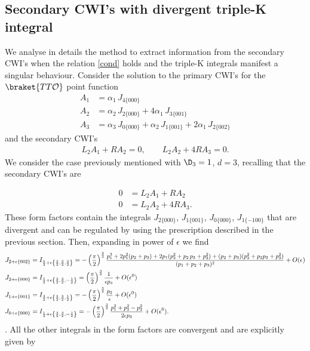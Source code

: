 \documentclass[a4paper,11pt,openright,twoside]{book}
\newcommand{\mO}{\mathcal{O}}
\let\a=\alpha   \let\b=\beta   \let\g=\gamma   \let\d=\delta
\let\e=\epsilon \let\z=\zeta   \let\h=\eta     \let\q=\theta
\newcommand{\sdfrac}[2]{\mbox{\small$\displaystyle\frac{#1}{#2}$}}
\numberwithin{equation}{section}
\begin{document}
{{{\subsection{Secondary CWI's with divergent triple-K integral} 
We analyse in details the method to extract information from the secondary CWI's when the relation \eqref{cond} holds and the triple-K integrals manifest a singular behaviour. 
Consider the solution to the primary CWI's for the $\braket{TT\mO}$ point function 
\begin{align}
	A_1&=\a_1\,J_{4\{000\}}\\
	A_2&=\a_2\,J_{2\{000\}}+4\a_{1}\,J_{3\{001\}}\\
	A_3&=\a_3\,J_{0\{000\}}+\a_{2}\,J_{1\{001\}}+2\a_{1}\,J_{2\{002\}}\label{TTOsol}
\end{align}
and the secondary CWI's
\begin{align}
	L_2A_1+RA_2=0,\qquad L_2A_2+4RA_3=0.
\end{align}
We consider the case previously mentioned with $\D_3=1$, $d=3$, recalling that the secondary CWI's are}
\begin{align}
0&=L_2A_1+RA_2\\
0&=L_2A_2+4RA_3.
\end{align}
{
These form factors contain the integrals $J_{2\{000\}}$, $J_{1\{001\}}$, $J_{0\{000\}}$, $J_{1\{-100\}}$ that are divergent and can be regulated by using the prescription described in the previous section. Then, expanding in power of $\epsilon$ we find
\begin{align}
	J_{2+\e\{002\}}&=I_{\frac{5}{2}+\e\left\{\frac{3}{2},\frac{3}{2},\frac{3}{2}\right\}}=-\left(\sdfrac{\pi}{2}\right)^\frac{3}{2}\sdfrac{p_1^3+2p_1^2(p_2+p_3)+2p_1(p_2^2+p_2\,p_3+p_3^2)+(p_2+p_3)(p_2^2+p_2p_3+p_3^2)}{(p_1+p_2+p_3)^2}+O(\e)\notag\\
	J_{2+\e\{000\}}&=I_{\frac{5}{2}+\e\left\{\frac{3}{2},\frac{3}{2},-\frac{1}{2}\right\}}=\left(\sdfrac{\pi}{2}\right)^\frac{3}{2}\sdfrac{1}{\e p_3}+O(\e^0)\notag\\
	J_{1+\e\{001\}}&=I_{\frac{3}{2}+\e\left\{\frac{3}{2},\frac{3}{2},\frac{1}{2}\right\}}=-\left(\sdfrac{\pi}{2}\right)^\frac{3}{2}\sdfrac{p_3}{\e}+O(\e^0)\notag\\
	J_{0+\e\{000\}}&=I_{\frac{1}{2}+\e\left\{\frac{3}{2},\frac{3}{2},-\frac{1}{2}\right\}}=-\left(\sdfrac{\pi}{2}\right)^\frac{3}{2}\sdfrac{p_1^2+p_2^2-p_3^2}{2\e p_3}+O(\e^0).\label{integrals}
\end{align}.
All the other integrals in the form factors are convergent and are explicitly given by
}}}
\end{document}
